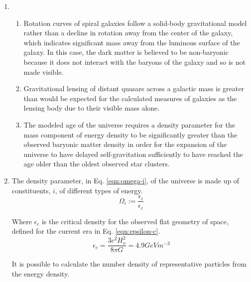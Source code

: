 \documentclass{paper}
\begin{document}
\begin{enumerate}
\begin{enumerate}
      \end{enumerate}

    \item

      \begin{enumerate}

        \item
          Rotation curves of spiral galaxies follow a solid-body 
          gravitational model rather than a decline in rotation away from
          the center of the galaxy, which indicates significant mass away
          from the luminous surface of the galaxy. In this case, the dark
          matter is believed to be non-baryonic because it does not interact 
          with the baryons of the galaxy and so is not made visible.

        \item
          Gravitational lensing of distant quasars across a galactic mass
          is greater than would be expected for the calculated measures of 
          galaxies as the lensing body due to their visible mass alone.

        \item
          The modeled age of the universe requires a density parameter for
          the mass component of energy density to be significantly greater
          than the observed baryonic matter density in order for the 
          expansion of the universe to have delayed self-gravitation
          sufficiently to have reached the age older than the oldest
          observed star clusters.

      \end{enumerate}

    \item
      The density parameter, in Eq. \ref{eqn:omega-i}, of the universe is 
      made up of constituents, \(i\), of different types of energy.
      \begin{equation}
        \Omega_i := \frac{\epsilon_i}{\epsilon_c}
        \label{eqn:omega-i}
      \end{equation}

      Where \(\epsilon_c\) is the critical density for the observed flat
      geometry of space, defined for the current era in Eq. 
      \ref{eqn:epsilon-c}.
      \begin{equation}
        \epsilon_c = \frac{3 c^2 H_o^2}{8 \pi G} = 4.9 \si{GeV m^{-3}}
        \label{eqn:epsilon-c}
      \end{equation}

      It is possible to calculate the number density of representative
      particles from the energy density.


\end{enumerate}
\end{document}
